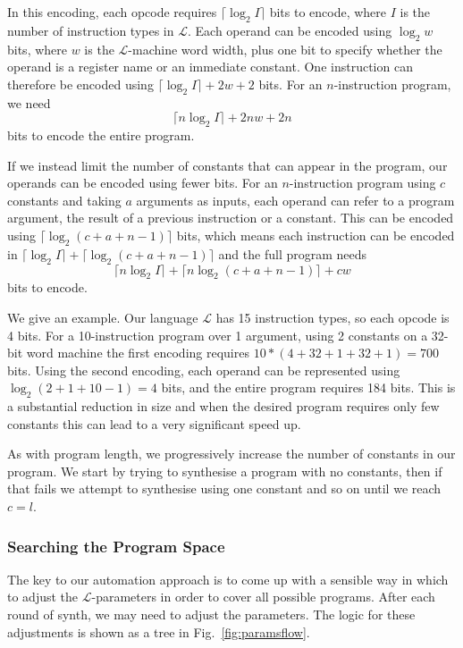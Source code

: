 In this encoding, each opcode requires $\lceil \log_2 I \rceil$ bits to encode, where $I$ is the number
of instruction types in $\mathcal{L}$.  Each operand can be encoded using
$\log_2 w$ bits, where $w$ is the $\mathcal{L}$-machine word width, plus one
bit to specify whether the operand is a register name or an immediate constant.
One instruction can therefore be encoded using $\lceil \log_2 I \rceil + 2w + 2$ bits.
For an $n$-instruction program, we need $$\lceil n \log_2 I \rceil + 2nw + 2n$$ bits to encode
the entire program.

If we instead limit the number of constants that can appear in the program,
our operands can be encoded using fewer bits.  For an $n$-instruction program
using $c$ constants and taking $a$ arguments as inputs, each operand can refer
to a program argument, the result of a previous instruction or a constant.
This can be encoded using $\lceil \log_2 (c+a+n-1) \rceil$ bits, which means each instruction
can be encoded in $\lceil \log_2 I \rceil + \lceil \log_2 (c + a + n - 1) \rceil$ and the full program
needs $$\lceil n \log_2 I \rceil + \lceil n \log_2 (c + a + n - 1) \rceil + cw$$ bits to encode.

We give an example. Our language $\mathcal{L}$ has 15 instruction types, so each opcode is 4 bits.
For a 10-instruction program over 1 argument, using 2 constants on a 32-bit word
machine the first encoding requires $10 * (4 + 32 + 1 + 32 + 1) = 700$ bits.
Using the second encoding, each operand can be represented using
$\log_2 (2 + 1 + 10 - 1) = 4$ bits, and the entire program requires 184 bits.
This is a substantial reduction in size and when the desired program requires
only few constants this can lead to a very significant speed up.

As with program length, we progressively increase the number of constants in
our program.  We start by trying to synthesise a program with no constants,
then if that fails we attempt to synthesise using one constant and so on until we
reach $c = l$.

\subsubsection{Searching the Program Space}

The key to our automation approach is to come up with a sensible way in which to
adjust the $\mathcal{L}$-parameters in order to cover all possible programs.
After each round of {\sc synth}, we may need to adjust the parameters.  The
logic for these adjustments is shown as a tree in Fig.~\ref{fig:paramsflow}.

